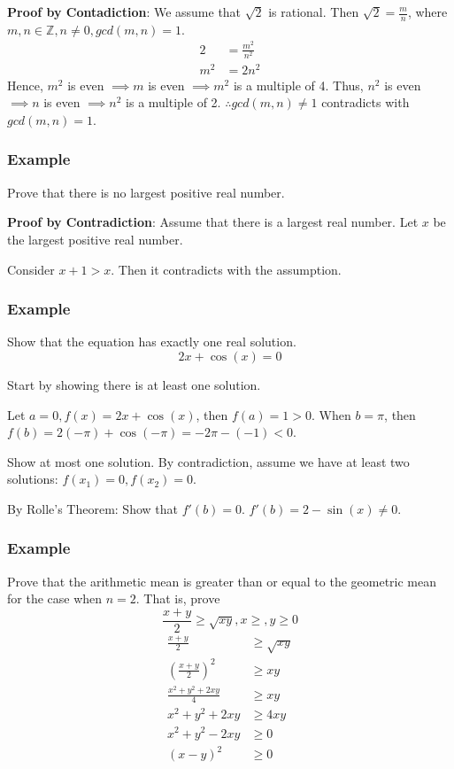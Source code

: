 \documentclass{article}
\begin{document}
\textbf{Proof by Contadiction}: We assume that $ \sqrt{2} $ is rational. Then $ \sqrt{2} = \frac{ m }{ n } $, where $ m, n \in \mathbb{Z}, n \neq 0, gcd(m, n) = 1 $.
\begin{align*}
	2 & = \frac{ m^2 }{ n^2 } \\
	m^2 & = 2n^2
\end{align*}
Hence, $ m^2 $ is even $ \implies m $ is even $ \implies m^2 $ is a multiple of 4. Thus, $ n^2 $ is even $ \implies n $ is even $ \implies n^2 $ is a multiple of 2. $ \therefore gcd(m, n) \neq 1 $ contradicts with $ gcd(m, n) = 1 $.

\subsubsection{Example}

Prove that there is no largest positive real number.

\textbf{Proof by Contradiction}: Assume that there is a largest real number. Let $ x $ be the largest positive real number.

Consider $ x + 1 > x $. Then it contradicts with the assumption.

\subsubsection{Example}

Show that the equation has exactly one real solution.
\begin{equation*}
	2x + \cos(x) = 0
\end{equation*}

Start by showing there is at least one solution.

Let $ a = 0, f(x) = 2x + \cos(x) $, then $ f(a) = 1 > 0 $. When $ b = \pi $, then $ f(b) = 2(-\pi) + \cos(-\pi) = -2\pi - (-1) < 0 $.

Show at most one solution. By contradiction, assume we have at least two solutions: $ f(x_1) = 0, f(x_2) = 0 $.

By Rolle's Theorem: Show that $ f'(b) = 0 $. $ f'(b) = 2 - \sin(x) \neq 0 $.

\subsubsection{Example}

Prove that the arithmetic mean is greater than or equal to the geometric mean for the case when $ n = 2 $. That is, prove
\begin{equation*}
	\frac{ x + y }{ 2 } \geq \sqrt{ xy }, x \geq, y \geq 0
\end{equation*}
\begin{align*}
	\frac{ x + y }{ 2 } & \geq \sqrt{ xy } \\
	\left( \frac{ x + y }{ 2 } \right)^2 & \geq xy \\
	\frac{ x^2 + y^2 + 2xy }{ 4 } & \geq xy \\
	x^2 + y^2 + 2xy & \geq 4xy \\
	x^2 + y^2 - 2xy & \geq 0 \\
	(x - y)^2 & \geq 0
\end{align*}
\end{document}
